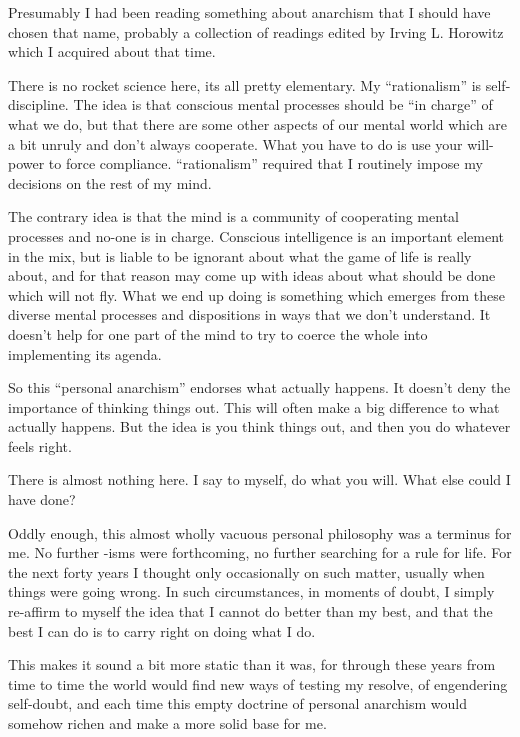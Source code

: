 Presumably I had been reading something about anarchism that I should have chosen that name, probably a collection of readings edited by Irving L. Horowitz which I acquired about that time.

There is no rocket science here, its all pretty elementary.
My ``rationalism'' is self-discipline.
The idea is that conscious mental processes should be ``in charge'' of what we do, but that there are some other aspects of our mental world which are a bit unruly and don't always cooperate.
What you have to do is use your will-power to force compliance.
``rationalism'' required that I routinely impose my decisions on the rest of my mind.

The contrary idea is that the mind is a community of cooperating mental processes and no-one is in charge.
Conscious intelligence is an important element in the mix, but is liable to be ignorant about what the game of life is really about, and for that reason may come up with ideas about what should be done which will not fly.
What we end up doing is something which emerges from these diverse mental processes and dispositions in ways that we don't understand.
It doesn't help for one part of the mind to try to coerce the whole into implementing its agenda.

So this ``personal anarchism'' endorses what actually happens.
It doesn't deny the importance of thinking things out.
This will often make a big difference to what actually happens.
But the idea is you think things out, and then you do whatever feels right.

There is almost nothing here.
I say to myself, do what you will.
What else could I have done?

Oddly enough, this almost wholly vacuous personal philosophy was a terminus for me.
No further -isms were forthcoming, no further searching for a rule for life.
For the next forty years I thought only occasionally on such matter, usually when things were going wrong.
In such circumstances, in moments of doubt, I simply re-affirm to myself the idea that I cannot do better than my best, and that the best I can do is to carry right on doing what I do.


This makes it sound a bit more static than it was, for through these years from time to time the world would find new ways of testing my resolve, of engendering self-doubt, and each time this empty doctrine of personal anarchism would somehow richen and make a more solid base for me.







